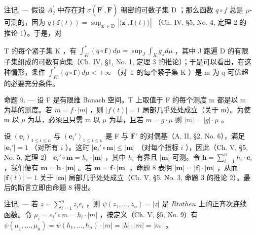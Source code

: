 注记. --- 假设 \(A_{q}^{\prime}\) 中存在对 \(\sigma(\mathbf{F}^{\prime},\mathbf{F})\) 稠密的可数子集 D ；那么函数 \(q\circ f\) 总是 \(\mu\)-可测的，因为 \(q(\mathbf{f}(t)) = \sup_{\mathbf{z}^{\prime}\in\mathrm{D}} |\langle\mathbf{z}^{\prime},\mathbf{f}(t)\rangle|\) （Ch. IV, §5, No. 4, 定理 2 的推论 1）。于是，对

T 的每个紧子集 K ，有 \(\int_{K}^{*}(q\circ\mathbf{f})d\mu=\sup_{J}\int_{K}g_{J}d\mu\) ，其中 J 跑遍 D 的有限子集组成的可数有向集（Ch. IV, §1, No. 1, 定理 3 的推论）；于是可以看出，在这种情形，条件 \(\int_{K}^{*}(q\circ\mathbf{f})d\mu<+\infty\) （对 T 的每个紧子集 K ）是 m 为 q-可优超的必要充分条件。

命题 9. --- 设 F 是有限维 Banach 空间。T 上取值于 F 的每个测度 m 都是以 \textbar m\textbar 为基的测度。若 \(m = f \cdot |m|\) ，则 \(|f(t)| = 1\) 局部几乎处处成立（关于 \textbar m\textbar ）。为使 m 以 \(\mu\) 为基，必须且只需 \textbar m\textbar{} 以 \(\mu\) 为基，且若 \(m = g \cdot \mu\) 则 \(|m| = |g| \cdot \mu\) 。

设 \((\mathbf{e}_i)_{1 \leqslant i \leqslant n}\) 与 \((\mathbf{e}_i')_{1 \leqslant i \leqslant n}\) 是 F 与 \(\mathbf{F}'\) 的对偶基（A, II, §2, No. 6），满足 \(|\mathbf{e}_i'| = 1\) （对所有 \(i\) ）。这时 \(|\mathbf{e}_i' \circ \mathbf{m}| \leqslant |\mathbf{m}|\) （对每个指标 \(i\) ），因此（Ch. V, §5, No. 5, 定理 2） \(\mathbf{e}_i' \circ \mathbf{m} = h_i \cdot |\mathbf{m}|\) ，其中 \(h_i\) 有界且 \(|\mathbf{m}|\)-可测。令 \(\mathbf{h} = \sum_{i=1}^{n} h_i \cdot \mathbf{e}_i\) ，我们便有 \(\mathbf{m} = \mathbf{h} \cdot |\mathbf{m}|\) 。若 \(\mathbf{m} = \mathbf{f} \cdot |\mathbf{m}|\) ，命题 8 表明 \(|\mathbf{m}| = |\mathbf{f}| \cdot |\mathbf{m}|\) ，从而 \(|\mathbf{f}(t)| = 1\) 关于 \(|\mathbf{m}|\) 局部几乎处处成立（Ch. V, §5, No. 3, 命题 3 的推论 2）。最后的断言立即由命题 8 得出。

注记. --- 若 \(z = \sum_{i=1}^{n} z_i e_i\) ，则 \(\psi(z_1, \ldots, z_n) = |z|\) 是 \(R to the n\) 上的正齐次连续函数。令 \(\mu_i = e_i' \circ m = h_i \cdot |m|\) ，按定义（Ch. V, §5, No. 9）有 \(\psi(\mu_1, \ldots, \mu_n) = \psi(h_1, \ldots, h_n) \cdot |m| = |h| \cdot |m| = |m|\) 。

